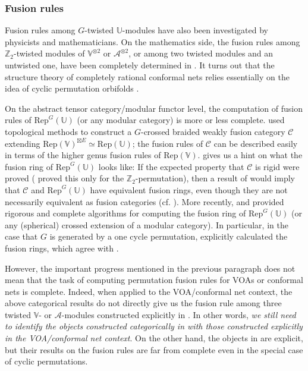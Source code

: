 \documentclass[12pt,a4paper,notitlepage]{article}
\theoremstyle{definition}
\theoremstyle{plain}
\newcommand{\mc}{\mathcal}
\newcommand{\Rep}{\mathrm{Rep}}
\newcommand{\scr}{\mathscr}
\newcommand{\mbb}{\mathbb}
\newcommand{\Vbb}{\mathbb V}
\newcommand{\Ubb}{\mathbb U}
\newcommand{\Zbb}{\mathbb Z}
\numberwithin{equation}{subsection}
\begin{document}
\subsubsection*{Fusion rules}

Fusion rules among $G$-twisted $\Ubb$-modules have also been investigated by physicists \cite{BHS98,Ban98,Ban02} and mathematicians. On the mathematics side, the fusion rules among $\Zbb_2$-twisted modules of $\Vbb^{\otimes 2}$ or $\mc A^{\otimes 2}$, or among two twisted modules and an untwisted one, have been completely determined in \cite{LX04,KLX05,DLXY19}. It turns out that the structure theory of completely rational conformal nets relies essentially on the idea of  cyclic permutation orbifolds \cite{KLM01,LX04}.

On the abstract tensor category/modular functor level, the computation of fusion rules of $\Rep^G(\Ubb)$ (or any modular category) is more or less complete. \cite{BS11} used topological methods to construct a $G$-crossed  braided weakly fusion category $\scr C$ extending $\Rep(\Vbb)^{\boxtimes E}\simeq\Rep(\Ubb)$;  the fusion rules of $\scr C$ can be described easily in terms of the higher genus fusion rules of $\Rep(\Vbb)$. \cite{BS11} gives us a hint on what the fusion ring of $\Rep^G(\Ubb)$ looks like: If the expected property that $\scr C$ is rigid were proved (\cite{BS11} proved this only for the $\Zbb_2$-permutation), then a result of \cite{ENO10} would imply that $\scr C$ and $\Rep^G(\Ubb)$ have equivalent fusion rings, even though they are not necessarily equivalent as fusion categories (cf. \cite{Bis20,EG18}).
More recently, \cite{BJ19} and \cite{Del19} provided rigorous and complete algorithms for computing the fusion ring of $\Rep^G(\Ubb)$ (or any (spherical) crossed extension of a modular category). In particular, in the case that $G$ is generated by a one cycle permutation, \cite{BJ19} explicitly calculated the fusion rings, which agree with \cite{BS11}.


However, the important progress mentioned in the previous paragraph does not mean that the task of computing permutation fusion rules for VOAs or conformal nets is complete. Indeed,  when applied to the VOA/conformal net context, the above categorical results do not directly give us the fusion rule among three twisted $\Vbb$- or $\mc A$-modules constructed explicitly in \cite{BDM02,LX04,KLX05}.  In other words, \textit{we still need to identify the objects constructed categorically in \cite{BS11,BJ19,Del19} with those constructed explicitly in the VOA/conformal net context}. On the other hand, the objects in \cite{LX04,KLX05,DLXY19} are explicit, but their results on the fusion rules are  far from complete even in the special case of cyclic permutations.
\end{document}
